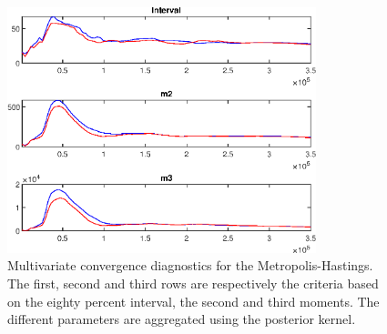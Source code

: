  
\begin{figure}[H]
\centering 
\includegraphics[width=0.8\textwidth]{RBC_sectoral/Output/RBC_sectoral_mdiag}
\caption{Multivariate convergence diagnostics for the Metropolis-Hastings.
The first, second and third rows are respectively the criteria based on
the eighty percent interval, the second and third moments. The different 
parameters are aggregated using the posterior kernel.}\label{Fig:MultivariateDiagnostics}
\end{figure}


